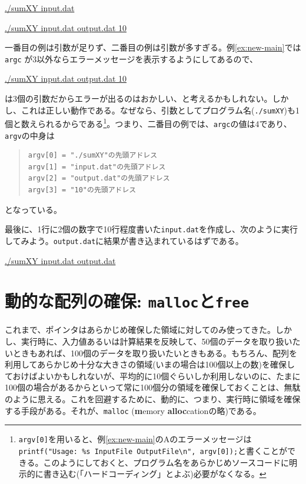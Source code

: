 \begin{commandline2}
\prompt \underline{./sumXY input.dat}
\end{commandline2} \noindent
\begin{commandline2}
\prompt \underline{./sumXY input.dat output.dat 10}
\end{commandline2} \noindent
一番目の例は引数が足りず、二番目の例は引数が多すぎる。例\ref{ex:new-main}では \verb|argc| が3以外ならエラーメッセージを表示するようにしてあるので、
\begin{commandline2}
\prompt \underline{./sumXY input.dat output.dat 10}
\end{commandline2} \noindent
は3個の引数だからエラーが出るのはおかしい、と考えるかもしれない。しかし、これは正しい動作である。なぜなら、引数としてプログラム名(\verb|./sumXY|)も1個と数えられるからである\footnote{{\tt argv[0]}を用いると、例\ref{ex:new-main}のAのエラーメッセージは {\tt printf("Usage: \%s InputFile OutputFile\textbackslash n", argv[0]);}と書くことができる。このようにしておくと、プログラム名をあらかじめソースコードに明示的に書き込む(「ハードコーディング」とよぶ)必要がなくなる。}。つまり、二番目の例では、{\tt argc}の値は4であり、{\tt argv}の中身は
\begin{quote}
\begin{verbatim}
argv[0] = "./sumXY"の先頭アドレス
argv[1] = "input.dat"の先頭アドレス
argv[2] = "output.dat"の先頭アドレス
argv[3] = "10"の先頭アドレス
\end{verbatim}
\end{quote}
となっている。

最後に、1行に2個の数字で10行程度書いた{\tt input.dat}を作成し、次のように実行してみよう。{\tt output.dat}に結果が書き込まれているはずである。
\begin{commandline2}
\prompt \underline{./sumXY input.dat output.dat}
\end{commandline2}

%
\section{動的な配列の確保: {\tt malloc}と{\tt free}}
\label{sec:clang:malloc}
これまで、ポインタはあらかじめ確保した領域に対してのみ使ってきた。しかし、実行時に、入力値あるいは計算結果を反映して、50個のデータを取り扱いたいときもあれば、100個のデータを取り扱いたいときもある。もちろん、配列を利用してあらかじめ十分な大きさの領域(いまの場合は100個以上の数)を確保しておけばよいかもしれないが、平均的に10個ぐらいしか利用しないのに、たまに100個の場合があるからといって常に100個分の領域を確保しておくことは、無駄のように思える。これを回避するために、動的に、つまり、実行時に領域を確保する手段がある。それが、\verb|malloc| ({\bf m}emory {\bf alloc}cationの略)である。

